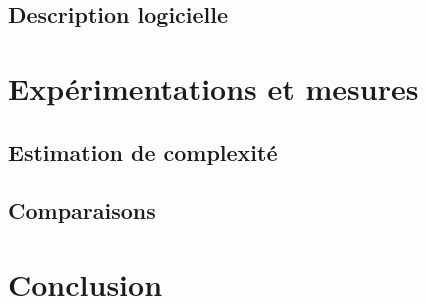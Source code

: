 \subsection{Description logicielle}

\section{Expérimentations et mesures}

\subsection{Estimation de complexité}
\subsection{Comparaisons}

\section*{Conclusion}

